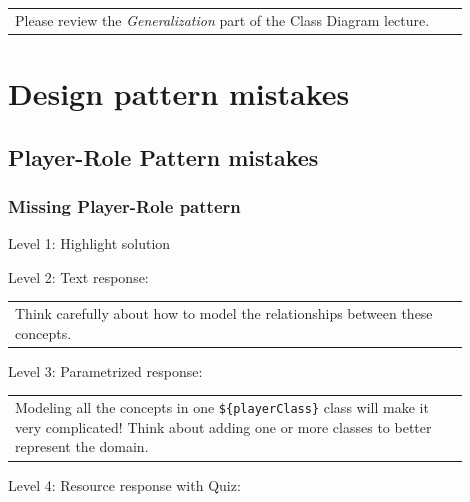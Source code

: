 \begin{tabular}{|p{0.9\linewidth}}
Please review the \textit{Generalization} part of the Class Diagram lecture.
\end{tabular} \medskip




\section{Design pattern mistakes}

\subsection{Player-Role Pattern mistakes}

\subsubsection{Missing Player-Role pattern}

\noindent Level 1: Highlight solution  \medskip

\noindent Level 2: Text response: \medskip

\begin{tabular}{|p{0.9\linewidth}}
Think carefully about how to model the relationships between these concepts.
\end{tabular} \medskip

\noindent Level 3: Parametrized response: \medskip

\begin{tabular}{|p{0.9\linewidth}}
Modeling all the concepts in one \verb|${playerClass}| class will make it very complicated! Think about adding one or more classes to better represent the domain.
\end{tabular} \medskip

\noindent Level 4: Resource response with Quiz: \medskip


